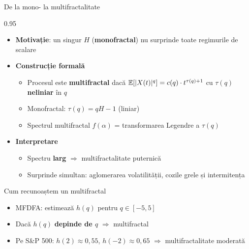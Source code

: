 \documentclass[9pt, aspectratio=169, t]{beamer}
\begin{document}
\begin{frame}[shrink=15]{De la mono- la multifractalitate}
\begin{cminipage}{0.95\textwidth}
\begin{itemize}\setlength{\itemsep}{1pt}
    \item \textbf{Motivație}: un singur $H$ (\textbf{monofractal}) nu surprinde toate regimurile de scalare
    \item \textbf{Construcție formală}
    \begin{itemize}\setlength{\itemsep}{0pt}
        \item Procesul este \textbf{multifractal} dacă $\mathbb{E}[|X(t)|^q]=c(q)\cdot t^{\tau(q)+1}$ cu $\tau(q)$ \textbf{neliniar} în $q$
        \item Monofractal: $\tau(q)=qH-1$ (liniar)
        \item Spectrul multifractal $f(\alpha)$ = transformarea Legendre a $\tau(q)$
    \end{itemize}
    \item \textbf{Interpretare}
    \begin{itemize}\setlength{\itemsep}{0pt}
        \item Spectru \textbf{larg} $\Rightarrow$ multifractalitate puternică
        \item Surprinde simultan: aglomerarea volatilității, cozile grele și intermitența
    \end{itemize}
\end{itemize}
\vspace{0.1cm}
\begin{exampleblock}{Cum recunoaștem un multifractal}
\begin{itemize}\setlength{\itemsep}{0pt}
    \item MFDFA: estimează $h(q)$ pentru $q\in[-5,5]$
    \item Dacă $h(q)$ \textbf{depinde de $q$} $\Rightarrow$ multifractal
    \item Pe S\&P 500: $h(2)\approx 0{,}55$, $h(-2)\approx 0{,}65$ $\Rightarrow$ multifractalitate moderată
\end{itemize}
\end{exampleblock}
\end{cminipage}
\end{frame}
\end{document}
